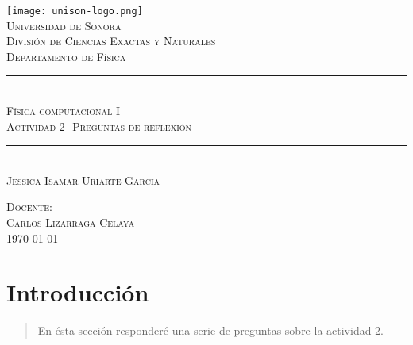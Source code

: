 \documentclass[12pt]{article}
\newcommand{\HRule}{\rule{\linewidth}{0.5mm}}
\begin{document}

\begin{center}


\texttt{[image: unison-logo.png]}~\\[1cm]

\textsc{\LARGE Universidad de Sonora}\\[0.1cm]
\textsc{Divisi\'on de Ciencias Exactas y Naturales}\\[0.1cm]
\textsc{Departamento de F\'isica}\\[1.5cm]

\HRule \\[0.4cm]
\textsc{Física computacional I}\\[0.1cm]
\textsc{Actividad 2- Preguntas de reflexión}
\HRule \\[1.5cm]





\textsc{Jessica Isamar Uriarte García\\[1.0cm]}

\textsc{Docente:\\Carlos Lizarraga-Celaya\\[0.1cm]}
\vfill
\textsc{\today \\[0.1cm]}
\end{center}
\newpage
\section{Introducción}
\begin{abstract}
En ésta sección responderé una serie de preguntas sobre la actividad 2.  
\end{abstract}
\end{document}
